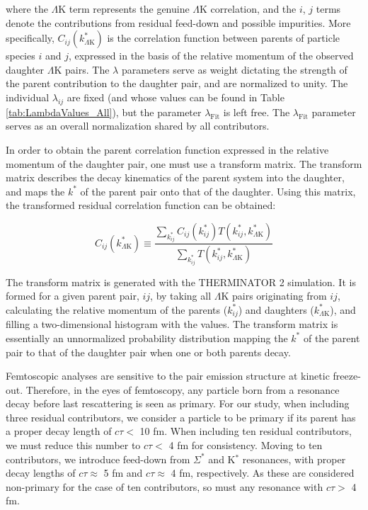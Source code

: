 \documentclass[ALICE,manyauthors]{cernphprep}
\newcommand{\kstar}{$k^{*}$\xspace}
\newcommand{\LamK}{$\Lambda$K\xspace}
\begin{document}
where the \LamK term represents the genuine \LamK correlation, and the $i$, $j$ terms denote the contributions from residual feed-down and possible impurities.
More specifically, $C_{ij}(k^{*}_{\Lambda\mathrm{K}})$ is the correlation function between parents of particle species $i$ and $j$, expressed in the basis of the relative momentum of the observed daughter \LamK pairs.  
The $\lambda$ parameters serve as weight dictating the strength of the parent contribution to the daughter pair, and are normalized to unity.
The individual $\lambda_{ij}$ are fixed (and whose values can be found in Table \ref{tab:LambdaValues_All}), but the parameter $\lambda_{\mathrm{Fit}}$ is left free.
The $\lambda_{\mathrm{Fit}}$ parameter serves as an overall normalization shared by all contributors.

In order to obtain the parent correlation function expressed in the relative momentum of the daughter pair, one must use a transform matrix.
The transform matrix describes the decay kinematics of the parent system into the daughter, and maps the \kstar of the parent pair onto that of the daughter.
Using this matrix, the transformed residual correlation function can be obtained:


\begin{equation}
  C_{ij}(k^{*}_{\Lambda\mathrm{K}}) \equiv \frac{\sum\limits_{k^{*}_{ij}} C_{ij}\left(k^{*}_{ij}\right) T\left(k^{*}_{ij},k^{*}_{\Lambda\mathrm{K}}\right)}{\sum\limits_{k^{*}_{ij}} T\left(k^{*}_{ij},k^{*}_{\Lambda\mathrm{K}}\right)}
\label{eqn:ResidualsTransform}
\end{equation}


The transform matrix is generated with the THERMINATOR 2 \cite{Chojnacki:2011hb} simulation. 
It is formed for a given parent pair, $ij$, by taking all \LamK pairs originating from $ij$, calculating the relative momentum of the parents ($k^{*}_{ij}$) and daughters ($k^{*}_{\Lambda\mathrm{K}}$), and filling a two-dimensional histogram with the values. 
The transform matrix is essentially an unnormalized probability distribution mapping the \kstar of the parent pair to that of the daughter pair when one or both parents decay.

Femtoscopic analyses are sensitive to the pair emission structure at kinetic freeze-out.
Therefore, in the eyes of femtoscopy, any particle born from a resonance decay before last rescattering is seen as primary.
For our study, when including three residual contributors, we consider a particle to be primary if its parent has a proper decay length of $c\tau <$ 10 fm.
When including ten residual contributors, we must reduce this number to $c\tau <$ 4 fm for consistency.
Moving to ten contributors, we introduce feed-down from $\Sigma^{*}$ and K$^{*}$ resonances, with proper decay lengths of $c\tau \approx$ 5 fm and $c\tau \approx$ 4 fm, respectively.
As these are considered non-primary for the case of ten contributors, so must any resonance with $c\tau >$ 4 fm.
\end{document}
